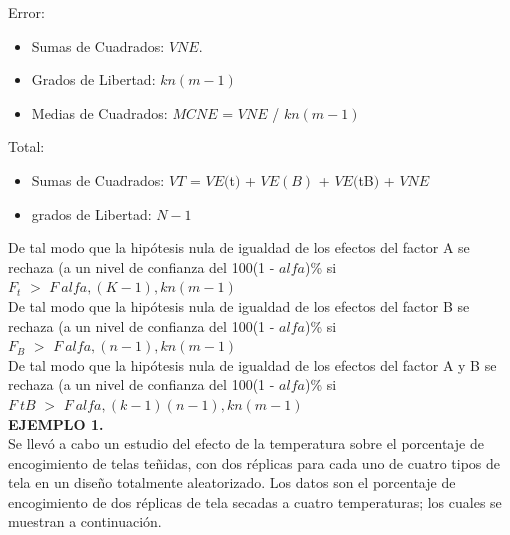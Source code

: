\documentclass[12pt,letterpaper]{article}\usepackage[]{graphicx}\usepackage[]{color}
\begin{document}
Error:
\begin{itemize}
  \item Sumas de Cuadrados: $VNE$.
  \item Grados de Libertad: $kn(m - 1)$
  \item Medias de Cuadrados: $MCNE$ = $VNE$ / $kn(m - 1)$
\end{itemize}

Total:
\begin{itemize}
  \item Sumas de Cuadrados: $VT$ = $VE($t$)$ + $VE(B)$ + $VE($tB$)$ + $VNE$
  \item grados de Libertad: $N - 1$
\end{itemize}

De tal modo que la hip\'otesis nula de igualdad de los efectos del factor A se rechaza (a un nivel de confianza del 100(1 - $alfa$)\% si\\

$F_t$ $>$ $F_\ alfa,(K-1),kn(m-1)$\\

De tal modo que la hip\'otesis nula de igualdad de los efectos del factor B se rechaza (a un nivel de confianza del 100(1 - $alfa$)\% si\\

$F_B$ $>$ $F_\ alfa,(n-1),kn(m-1)$\\

De tal modo que la hip\'otesis nula de igualdad de los efectos del factor A y B se rechaza (a un nivel de confianza del 100(1 - $alfa$)\% si\\

$F_\ tB$ $>$ $F_\ alfa,(k-1)(n-1),kn(m-1)$\\

\textbf{EJEMPLO 1.}\\

Se llev\'o a cabo un estudio del efecto de la temperatura sobre el porcentaje de encogimiento de telas te\~nidas, con dos r\'eplicas para cada uno de cuatro tipos de tela en un dise\~no totalmente aleatorizado. Los datos son el porcentaje de encogimiento de dos r\'eplicas de tela secadas a cuatro temperaturas; los cuales se muestran a continuaci\'on. 
\end{document}
